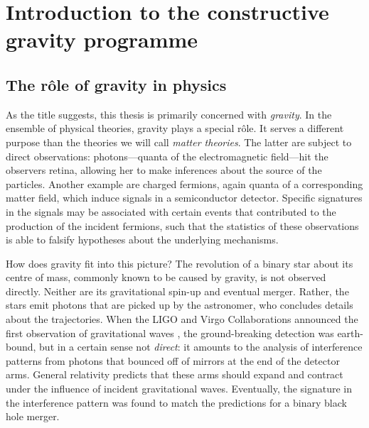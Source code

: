 \chapter{Introduction to the constructive gravity programme}\label{chapter_introduction}

\section{The r\^ole of gravity in physics}
As the title suggests, this thesis is primarily concerned with \emph{gravity}. In the ensemble of physical theories, gravity plays a special r\^ole. It serves a different purpose than the theories we will call \emph{matter theories}. The latter are subject to direct observations: photons---quanta of the electromagnetic field---hit the observers retina, allowing her to make inferences about the source of the particles. Another example are charged fermions, again quanta of a corresponding matter field, which induce signals in a semiconductor detector. Specific signatures in the signals may be associated with certain events that contributed to the production of the incident fermions, such that the statistics of these observations is able to falsify hypotheses about the underlying mechanisms.

How does gravity fit into this picture? The revolution of a binary star about its centre of mass, commonly known to be caused by gravity, is not observed directly. Neither are its gravitational spin-up and eventual merger. Rather, the stars emit photons that are picked up by the astronomer, who concludes details about the trajectories. When the LIGO and Virgo Collaborations announced the first observation of gravitational waves \cite{Abbott_2016}, the ground-breaking detection was earth-bound, but in a certain sense not \emph{direct}: it amounts to the analysis of interference patterns from photons that bounced off of mirrors at the end of the detector arms. General relativity predicts that these arms should expand and contract under the influence of incident gravitational waves. Eventually, the signature in the interference pattern was found to match the predictions for a binary black hole merger.

